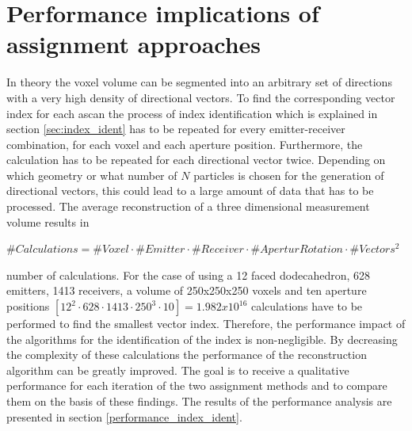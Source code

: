 \section{Performance implications of assignment approaches}
\label{Perform_eval}

In theory the voxel volume can be segmented into an arbitrary set of directions with a very high density of directional vectors. To find the corresponding vector index for each \ac{ascan} the process of index identification which is explained in section \ref{sec:index_ident} has to be repeated for every emitter-receiver combination, for each voxel and each aperture position. Furthermore, the calculation has to be repeated for each directional vector twice. Depending on which geometry or what number of $N$ particles is chosen for the generation of directional vectors, this could lead to a large amount of data that has to be processed. The average reconstruction of a three dimensional measurement volume results in

\smallskip

$\#Calculations = \#Voxel \cdot \#Emitter\cdot \#Receiver \cdot \#AperturRotation \cdot \#Vectors^2$

\smallskip
number of calculations. For the case of using a 12 faced dodecahedron, 628 emitters, 1413 receivers, a volume of 250x250x250 voxels and ten aperture positions $[12^2 \cdot 628 \cdot 1413 \cdot 250^3 \cdot 10] = 1.982x10^{16}$ calculations have to be performed to find the smallest vector index. Therefore, the performance impact of the algorithms for the identification of the index is non-negligible. By decreasing the complexity of these calculations the performance of the reconstruction algorithm can be greatly improved. The goal is to receive a qualitative performance for each iteration of the two assignment methods and to compare them on the basis of these findings.
The results of the performance analysis are presented in section \ref{performance_index_ident}.
